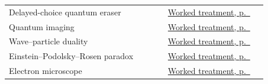 \documentclass[11pt,oneside]{book}
\begin{document}
\begin{longtable}{p{0.57\linewidth}p{0.35\linewidth}}
\label{index:delayed-choice-quantum-eraser}Delayed-choice quantum eraser & \hyperref[topic:delayed-choice-quantum-eraser]{Worked treatment, p.~\pageref*{topic:delayed-choice-quantum-eraser}} \\
\label{index:quantum-imaging}Quantum imaging & \hyperref[topic:quantum-imaging]{Worked treatment, p.~\pageref*{topic:quantum-imaging}} \\
\label{index:wave-particle-duality}Wave–particle duality & \hyperref[topic:wave-particle-duality]{Worked treatment, p.~\pageref*{topic:wave-particle-duality}} \\
\label{index:einstein-podolsky-rosen-paradox}Einstein–Podolsky–Rosen paradox & \hyperref[topic:einstein-podolsky-rosen-paradox]{Worked treatment, p.~\pageref*{topic:einstein-podolsky-rosen-paradox}} \\
\label{index:electron-microscope}Electron microscope & \hyperref[topic:electron-microscope]{Worked treatment, p.~\pageref*{topic:electron-microscope}} \\
\bottomrule
\end{longtable}
\end{document}
